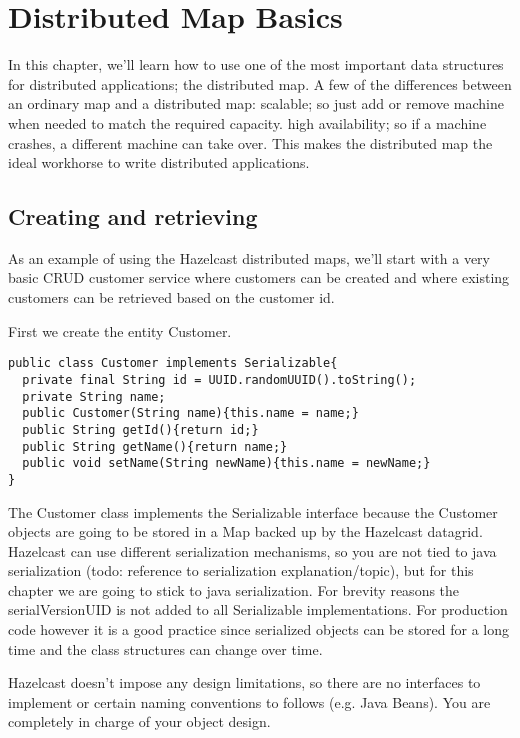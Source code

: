 \chapter{Distributed Map Basics}

In this chapter, we'll learn how to use one of the most important data structures for distributed applications; the distributed map. A few of the differences between an ordinary map and a distributed map:
scalable; so just add or remove machine when needed to match the required capacity. 
high availability; so if a machine crashes, a different machine can take over. 
This makes the distributed map the ideal workhorse to write distributed applications.

\section{Creating and retrieving}

As an example of using the Hazelcast distributed maps, we'll start with a  very basic CRUD customer service where customers can be created and where existing customers can be retrieved based on the customer id.

First we create the entity Customer. 

\begin{verbatim}
public class Customer implements Serializable{
  private final String id = UUID.randomUUID().toString();
  private String name;
  public Customer(String name){this.name = name;}
  public String getId(){return id;}
  public String getName(){return name;}
  public void setName(String newName){this.name = newName;}
}
\end{verbatim}

The Customer class implements the Serializable interface because the Customer objects are going to be stored in a Map backed up by the Hazelcast datagrid. Hazelcast can use different serialization mechanisms, so you are not tied to java serialization (todo: reference to serialization explanation/topic), but for this chapter we are going to stick to java serialization. For brevity reasons the serialVersionUID is not added to all Serializable implementations. For production code however it is a good practice since serialized objects can be stored for a long time and the class structures can change over time. 

Hazelcast doesn't impose any design limitations, so there are no interfaces to implement or certain naming conventions to follows (e.g. Java Beans). You are completely in charge of your object design.


